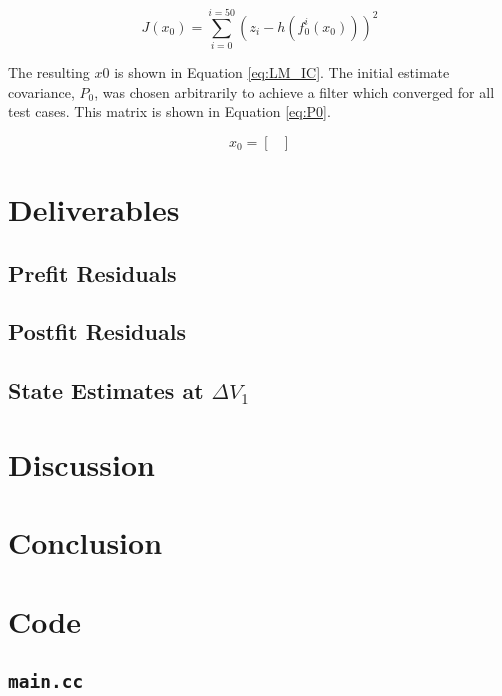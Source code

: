 \documentclass[11pt]{article}
\begin{document}
\begin{equation}
	\label{eq:ICcost}
	J(x_0) = \sum_{i=0}^{i=50} \left( z_i - h(f_{0}^{i}(x_0)) \right)^2 
\end{equation}

The resulting $x0$ is shown in Equation \eqref{eq:LM_IC}. The initial estimate covariance, $P_0$, was chosen arbitrarily to achieve a filter which converged for all test cases. This matrix is shown in Equation \eqref{eq:P0}.

\begin{equation}
	\label{eq:LM_IC}
	x_0 = \begin{bmatrix}
		
	\end{bmatrix}
\end{equation}

\section{Deliverables}

\subsection{Prefit Residuals}

\subsection{Postfit Residuals}

\subsection{State Estimates at $\Delta V_1$}

\section{Discussion}

\section{Conclusion}


\newpage
\appendix
\section{Code}

\subsection{\texttt{main.cc}}


\end{document}
